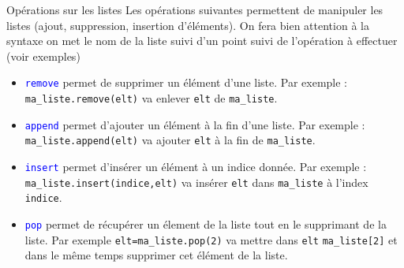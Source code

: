 \documentclass[10pt]{beamer}
\begin{document}
\begin{frame}
	\mframe{\Python}
	\begin{alertblock}{Opérations sur les listes}
		Les opérations suivantes permettent de manipuler les listes (ajout, suppression, insertion d'éléments). On fera bien attention à la syntaxe on met le nom de la liste suivi d'un point suivi de l'opération à effectuer (voir exemples)
		\begin{itemize}
			\item<1-> \textcolor{blue}{\tt remove} permet de supprimer un élément d'une liste. Par exemple : {\tt ma\_liste.remove(elt)} va enlever {\tt elt} de {\tt ma\_liste}.
			\item<2-> \textcolor{blue}{\tt append} permet d'ajouter un élément à la fin d'une liste. Par exemple : {\tt ma\_liste.append(elt)} va ajouter {\tt elt} à la fin de {\tt ma\_liste}.
			\item<3-> \textcolor{blue}{\tt insert} permet d'insérer un élément à un indice donnée. Par exemple : {\tt ma\_liste.insert(indice,elt)} va insérer {\tt elt} dans {\tt ma\_liste} à l'index {\tt indice}.
			\item<4-> \textcolor{blue}{\tt pop} permet de récupérer un élement de la liste tout en le supprimant de la liste. Par exemple {\tt elt=ma\_liste.pop(2)} va mettre dans {\tt elt} {\tt ma\_liste[2]} et dans le même temps supprimer cet élément de la liste.
		\end{itemize}
	\end{alertblock}
\end{frame}
\end{document}
